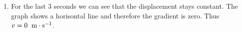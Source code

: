 {\begin{mdframed}[linewidth=4, leftmargin=40, rightmargin=40]
\begin{exercise}
\begin{enumerate}[noitemsep, label=\textbf{Step} \textbf{\arabic*}. ]
{    }{%
    \setlength{\mymathboxwidth}{\columnwidth}
      \addtolength{\mymathboxwidth}{-48pt}
    \par\vspace{12pt}\noindent\begin{minipage}{\columnwidth}
    \parbox[t]{\mymathboxwidth}{\large\begin{math}
    v=\frac{\Delta x}{\Delta t}=\frac{4\phantom{\rule{3.33333pt}{0ex}}\mathrm{m}-0\phantom{\rule{3.33333pt}{0ex}}\mathrm{m}}{4\phantom{\rule{3.33333pt}{0ex}}\mathrm{s}-0\phantom{\rule{3.33333pt}{0ex}}\mathrm{s}}=1\phantom{\rule{4pt}{0ex}}\phantom{\rule{0.166667em}{0ex}}\mathrm{m}\ensuremath{\cdot}{\mathrm{s}}^{-1}\end{math}}\hfill
    \parbox[t]{48pt}{\raggedleft 
    (20.40)}
    \end{minipage}\vspace{12pt}\par
    }%
    
      
      \item  
      \label{m38795*id74801}For the last 3 seconds we can see that the displacement stays constant. The graph shows a horisontal line and therefore the gradient is zero. Thus \begin{math}v=0\phantom{\rule{4pt}{0ex}}\phantom{\rule{0.166667em}{0ex}}\mathrm{m}\ensuremath{\cdot}{\mathrm{s}}^{-1}\end{math}. \par 
      \end{enumerate}
         

    \end{exercise}
    \end{mdframed}
    }
    \noindent
  
\label{m38795*secfhsst!!!underscore!!!id3755}\vspace{.5cm} 
      
